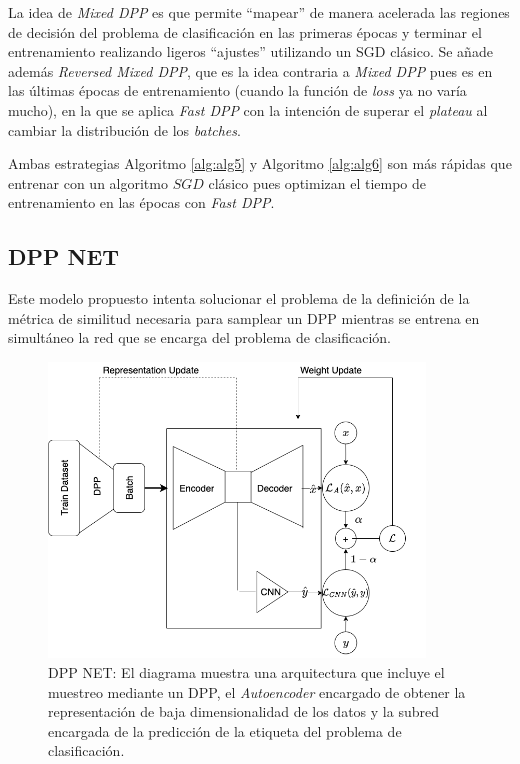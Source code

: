 La idea de \textit{Mixed DPP} es que permite ``mapear'' de manera acelerada las regiones de decisión del problema de clasificación en las primeras épocas y terminar el entrenamiento realizando ligeros ``ajustes'' utilizando un SGD clásico. Se añade además \textit{Reversed Mixed DPP}, que es la idea contraria a \textit{Mixed DPP} pues es en las últimas épocas de entrenamiento (cuando la función de \textit{loss} ya no varía mucho), en la que se aplica \textit{Fast DPP} con la intención de superar el \textit{plateau} al cambiar la distribución de los \textit{batches}. 


\vspace{0.2cm}

Ambas estrategias Algoritmo \ref{alg:alg5} y Algoritmo \ref{alg:alg6} son más rápidas que entrenar con un algoritmo $SGD$ clásico pues optimizan el tiempo de entrenamiento en las épocas con \textit{Fast DPP}. 

\subsection{DPP NET}

Este modelo propuesto intenta solucionar el problema de la definición de la métrica de similitud necesaria para samplear un DPP mientras se entrena en simultáneo la red que se encarga del problema de clasificación. 

\begin{figure}[ht]
    \centering
    \includegraphics[width=10cm]{img/tesis/dpp_net.png}
    \caption{DPP NET: El diagrama muestra una arquitectura que incluye el muestreo mediante un DPP, el \textit{Autoencoder} encargado de obtener la representación de baja dimensionalidad de los datos y la subred encargada de la predicción de la etiqueta del problema de clasificación.}
    \label{fig:dpp_net}
\end{figure}

